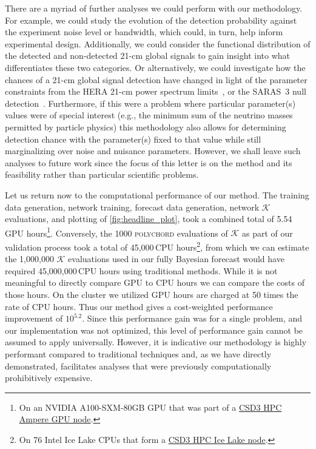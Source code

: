 \documentclass[twocolumn,english,aps,prd,amsmath,amssymb,reprint,floatfix,nofootinbib,showkeys]{revtex4-2}
\newcommand{\br}{\mathcal{K}}
\newif\ifhighlightchanges
\newcommand{\change}[1]{{\ifhighlightchanges\color{red} #1\else #1\fi}}
\begin{document}
There are a myriad of further analyses we could perform with our methodology. 
For example, we could study the evolution of the detection probability against the \change{experiment} noise level or bandwidth\change{, which could, in turn, help inform experimental design.}
Additionally, we could consider the functional distribution of the detected and non-detected 21-cm global signals to gain insight into what differentiates these two categories.
Or alternatively, we could investigate how the chances of a 21-cm global signal detection have changed in light of the parameter constraints from the HERA 21-cm power spectrum limits~\citep{HERA_theory_22, HERA_obs_23}, or the SARAS~3 null detection~\citep{SARAS3, Bevins_2022}.
\change{Furthermore, if this were a problem where particular parameter(s) values were of special interest (e.g., the minimum sum of the neutrino masses permitted by particle physics) this methodology also allows for determining detection chance with the parameter(s) fixed to that value while still marginalizing over noise and nuisance parameters.}
However, we shall leave \change{such} analyses to future work since the focus of this letter is on the method and its feasibility rather than particular scientific problems. 



Let us return now to the computational performance of our method.
The training data generation, network training,  forecast data generation, network $\br$ evaluations, and plotting of \cref{fig:headline_plot}, took a combined total of \change{5.54}\,GPU hours\footnote{On an NVIDIA A100-SXM-80GB GPU that was part of a \href{https://docs.hpc.cam.ac.uk/hpc/user-guide/a100.html}{CSD3 HPC Ampere GPU node}.}.
Conversely, the 1000 \textsc{polychord} evaluations of $\br$ as part of our validation process took a total of \change{45,000}\,CPU hours\footnote{On 76 Intel Ice Lake CPUs that form a \href{https://docs.hpc.cam.ac.uk/hpc/user-guide/icelake.html}{CSD3 HPC Ice Lake node}.}, from which we can estimate the 1,000,000 $\br$ evaluations used in our fully Bayesian forecast would have required \change{45,000,000}\,CPU hours using traditional methods. 
While it is not meaningful to directly compare GPU to CPU hours we can compare the costs of those hours.
On the cluster we utilized GPU hours are charged at 50 times the rate of CPU hours. 
Thus our method gives a cost-weighted performance improvement of \change{$10^{5.2}$}. 
Since this performance gain was for a single problem, and our implementation was not optimized, this level of performance gain cannot be assumed to apply universally. 
However, it is indicative our methodology is highly performant compared to traditional techniques and, as we have directly demonstrated, facilitates analyses that were previously computationally prohibitively expensive. 
\end{document}
